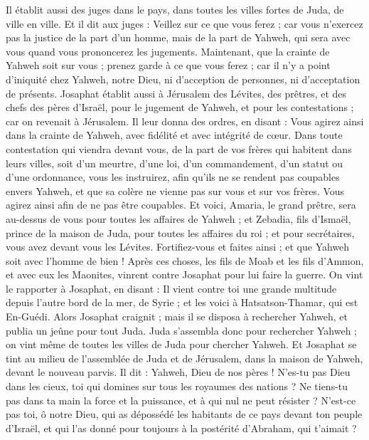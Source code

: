\begin{multicols}{2}
Il établit aussi des juges dans le pays, dans toutes les villes fortes de Juda, de ville en ville.
Et il dit aux juges : Veillez sur ce que vous ferez ; car vous n'exercez pas la justice de la part d'un homme, mais de la part de Yahweh, qui sera avec vous quand vous prononcerez les jugements.
Maintenant, que la crainte de Yahweh soit sur vous ; prenez garde à ce que vous ferez ; car il n'y a point d'iniquité chez Yahweh, notre Dieu, ni d'acception de personnes, ni d'acceptation de présents. 
Josaphat établit aussi à Jérusalem des Lévites, des prêtres, et des chefs des pères d'Israël, pour le jugement de Yahweh, et pour les contestations ; car on revenait à Jérusalem.
Il leur donna des ordres, en disant : Vous agirez ainsi dans la crainte de Yahweh, avec fidélité et avec intégrité de cœur.
Dans toute contestation qui viendra devant vous, de la part de vos frères qui habitent dans leurs villes, soit d'un meurtre, d'une loi, d'un commandement, d'un statut ou d'une ordonnance, vous les instruirez, afin qu'ils ne se rendent pas coupables envers Yahweh, et que sa colère ne vienne pas sur vous et sur vos frères. Vous agirez ainsi afin de ne pas être coupables.
Et voici, Amaria, le grand prêtre, sera au-dessus de vous pour toutes les affaires de Yahweh ; et Zebadia, fils d'Ismaël, prince de la maison de Juda, pour toutes les affaires du roi ; et pour secrétaires, vous avez devant vous les Lévites. Fortifiez-vous et faites ainsi ; et que Yahweh soit avec l'homme de bien !
\VerseOne{}Après ces choses, les fils de Moab et les fils d'Ammon, et avec eux les Maonites, vinrent contre Josaphat pour lui faire la guerre.
On vint le rapporter à Josaphat, en disant : Il vient contre toi une grande multitude depuis l'autre bord de la mer, de Syrie ; et les voici à Hatsatson-Thamar, qui est En-Guédi.
Alors Josaphat craignit ; mais il se disposa à rechercher Yahweh, et publia un jeûne pour tout Juda.
Juda s'assembla donc pour rechercher Yahweh ; on vint même de toutes les villes de Juda pour chercher Yahweh.
Et Josaphat se tint au milieu de l'assemblée de Juda et de Jérusalem, dans la maison de Yahweh, devant le nouveau parvis.
Il dit : Yahweh, Dieu de nos pères ! N'es-tu pas Dieu dans les cieux, toi qui domines sur tous les royaumes des nations ? Ne tiens-tu pas dans ta main la force et la puissance, et à qui nul ne peut résister ?
N'est-ce pas toi, ô notre Dieu, qui as dépossédé les habitants de ce pays devant ton peuple d'Israël, et qui l'as donné pour toujours à la postérité d'Abraham, qui t'aimait ?

\end{multicols}
